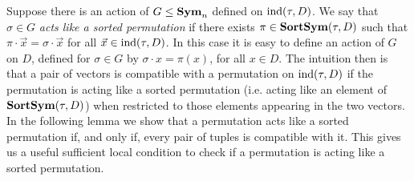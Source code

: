 \documentclass[../paper.tex]{subfiles}
\begin{document}
Suppose there is an action of $G \leq \text{\textbf{Sym}}_n$ defined on $\text{\upshape ind}(\tau, D)$. We say
that $\sigma \in G$ \emph{acts like a sorted permutation} if there exists $\pi
\in \text{\textbf{SortSym}}(\tau, D)$ such that $\pi \cdot \vec{x} = \sigma \cdot \vec{x}$ for
all $\vec{x} \in \text{\upshape ind}(\tau, D)$. In this case it is easy to define an action of
$G$ on $D$, defined for $\sigma \in G$ by $\sigma \cdot x = \pi (x)$, for all $x
\in D$. The intuition then is that a pair of vectors is compatible with a
permutation on $\text{\upshape ind}(\tau, D)$ if the permutation is acting like a sorted
permutation (i.e. acting like an element of $\text{\textbf{SortSym}}(\tau, D)$) when restricted
to those elements appearing in the two vectors. In the following lemma we show
that a permutation acts like a sorted permutation if, and only if, every pair of
tuples is compatible with it. This gives us a useful sufficient local condition
to check if a permutation is acting like a sorted permutation.
%






\end{document}
